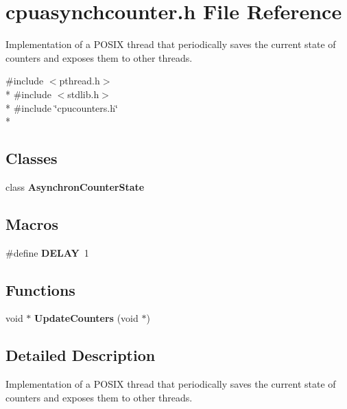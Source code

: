 \section{cpuasynchcounter.\+h File Reference}
\label{cpuasynchcounter_8h}


Implementation of a P\+O\+S\+I\+X thread that periodically saves the current state of counters and exposes them to other threads.  


{\ttfamily \#include $<$pthread.\+h$>$}\\*
{\ttfamily \#include $<$stdlib.\+h$>$}\\*
{\ttfamily \#include \char`\"{}cpucounters.\+h\char`\"{}}\\*
\subsection*{Classes}
\begin{DoxyCompactItemize}
\item 
class {\bf Asynchron\+Counter\+State}
\end{DoxyCompactItemize}
\subsection*{Macros}
\begin{DoxyCompactItemize}
\item 
\#define {\bfseries D\+E\+L\+A\+Y}~1\label{cpuasynchcounter_8h_a62249e384b997229a3e2ae74ade334e2}

\end{DoxyCompactItemize}
\subsection*{Functions}
\begin{DoxyCompactItemize}
\item 
void $\ast$ {\bfseries Update\+Counters} (void $\ast$)\label{cpuasynchcounter_8h_adfa97f5f86f053c95e1c725b790a3922}

\end{DoxyCompactItemize}


\subsection{Detailed Description}
Implementation of a P\+O\+S\+I\+X thread that periodically saves the current state of counters and exposes them to other threads. 

